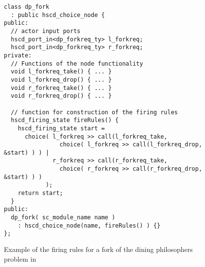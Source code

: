 \begin{figure}[h]
\centering
\begin{verbatim}
class dp_fork
  : public hscd_choice_node {
public:
  // actor input ports
  hscd_port_in<dp_forkreq_ty> l_forkreq;
  hscd_port_in<dp_forkreq_ty> r_forkreq;
private:
  // Functions of the node functionality
  void l_forkreq_take() { ... }
  void l_forkreq_drop() { ... }
  void r_forkreq_take() { ... }
  void r_forkreq_drop() { ... }
  
  // function for construction of the firing rules
  hscd_firing_state fireRules() {
    hscd_firing_state start =
      choice( l_forkreq >> call(l_forkreq_take,
                choice( l_forkreq >> call(l_forkreq_drop, &start) ) ) |
              r_forkreq >> call(r_forkreq_take,
                choice( r_forkreq >> call(r_forkreq_drop, &start) ) )
            );
    return start;
  }
public:
  dp_fork( sc_module_name name )
    : hscd_choice_node(name, fireRules() ) {}
};
\end{verbatim}
\caption{\label{systemoc-firing-rules-example}
  Example of the firing rules for a fork of the
  dining philosophers problem in \SysteMoC{}}
\end{figure}

